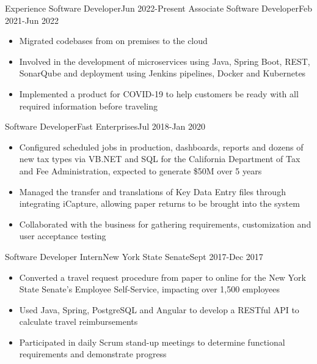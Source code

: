 \documentclass[]{xjavathehutt}
\begin{document}
\makeheader


\begin{cvsection}{Experience}
  {Software Developer}{Jun 2022-Present}
  {}
    {Associate Software Developer}{Feb 2021-Jun 2022}
    {\begin{itemize}
      \item{Migrated codebases from on premises to the cloud}
      \item{Involved in the development of microservices using Java, Spring Boot, REST, SonarQube and deployment using Jenkins pipelines, Docker and Kubernetes}
      \item{Implemented a product for COVID-19 to help customers be ready with all required information before traveling}
    \end{itemize}}

  \begin{cvsubsection}{Software Developer}{Fast Enterprises}{Jul 2018-Jan 2020}
    \begin{itemize}
      \item{Configured scheduled jobs in production, dashboards, reports and dozens of new tax
          types via VB.NET and SQL for the California Department of Tax and Fee Administration,
          expected to generate \$50M over 5 years}
      \item{Managed the transfer and translations of Key Data Entry files through integrating
          iCapture, allowing paper returns to be brought into the system}
      \item{Collaborated with the business for gathering requirements, customization and user
          acceptance testing}
    \end{itemize}
  \end{cvsubsection}

  \begin{cvsubsection}{Software Developer Intern}{New York State Senate}{Sept 2017-Dec 2017}
    \begin{itemize}
      \item{Converted a travel request procedure from paper to online for the New York
        State Senate's Employee Self-Service, impacting over 1,500 employees}
      \item{Used Java, Spring, PostgreSQL and Angular to develop a RESTful API to
        calculate travel reimbursements}
      \item{Participated in daily Scrum stand-up meetings to determine functional requirements and
        demonstrate progress}
    \end{itemize}
  \end{cvsubsection}


\end{cvsection}
\end{document}

